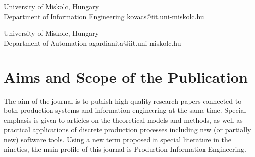 \documentclass{PSAIE}%
\begin{document}
%
%
%


\fancyfoot{}

\noindent{}

\noindent{}%
{University of Miskolc, Hungary\\[0pt]%
Department of Information Engineering}%
{kovacs@iit.uni-miskolc.hu}%

\noindent{}%
{University of Miskolc, Hungary\\[0pt]%
Department of Automation}%
{agardianita@iit.uni-miskolc.hu}%

\noindent\PSAIEreceived{\today}

\noindent{}

\noindent{}


\section{Aims and Scope of the Publication}

\noindent The aim of the journal is to publish high quality
research papers connected to both production systems and
information engineering at the same time. Special emphasis is
given to articles on the theoretical models and methods, as well
as practical applications of discrete production processes
including new (or partially new) software tools. Using a new term
proposed in special literature in the nineties, the main profile
of this journal is Production Information Engineering.
\end{document}
